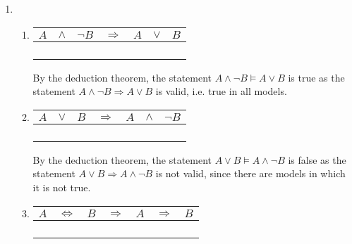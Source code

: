 \begin{enumerate}
\item
\begin{enumerate}
\item
\begin{tabular}{ccc|c|ccc}
$A$ & $\land$ & $\neg B$ & $\Rightarrow$ & $A$ & $\lor$ & $B$ \\
\hline
\F  & \F      & \T       & \T            & \F  & \F     & \F  \\
\F  & \F      & \F       & \T            & \F  & \T     & \T  \\
\T  & \T      & \T       & \T            & \T  & \T     & \F  \\
\T  & \F      & \F       & \T            & \T  & \T     & \T  \\
\end{tabular}

By the deduction theorem, the statement $A \land \neg B \vDash A \lor B$ is true as the statement $A \land \neg B \Rightarrow A \lor B$ is valid, i.e. true in all models.
\item
\begin{tabular}{ccc|c|ccc}
$A$ & $\lor$ & $B$ & $\Rightarrow$ & $A$ & $\land$ & $\neg B$ \\
\hline
\F  & \F     & \F  & \T            & \F  & \F      & \T       \\
\F  & \T     & \T  & \F            & \F  & \F      & \F       \\
\T  & \T     & \F  & \T            & \T  & \T      & \T       \\
\T  & \T     & \T  & \F            & \T  & \F      & \F       \\
\end{tabular}

By the deduction theorem, the statement $A \lor B \vDash A \land \neg B$ is false as the statement $A \lor B \Rightarrow A \land \neg B$ is not valid, since there are models in which it is not true.
\item
\begin{tabular}{ccc|c|ccc}
$A$ & $\Leftrightarrow$ & $B$ & $\Rightarrow$ & $A$ & $\Rightarrow$ & $B$ \\
\hline
\F  & \T                & \F  & \T            & \F  & \T            & \F  \\
\F  & \F                & \T  & \T            & \F  & \T            & \T  \\
\T  & \F                & \F  & \T            & \T  & \F            & \F  \\
\T  & \T                & \T  & \T            & \T  & \T            & \T  \\
\end{tabular}


\end{enumerate}
\end{enumerate}
